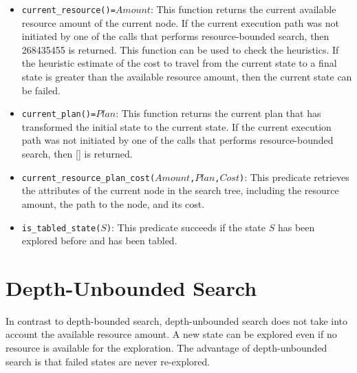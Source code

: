 \begin{itemize}
\item \texttt{current\_resource()=$Amount$}: This function returns the current available resource amount of the current node. If the current execution path was not initiated by one of the calls that performs resource-bounded search, then 268435455 is returned. This function can be used to check the heuristics. If the heuristic estimate of the cost to travel from the current state to a final state is greater than the available resource amount, then the current state can be failed.

\item \texttt{current\_plan()=$Plan$}: This function returns the current plan that has transformed the initial state to the current state. If the current execution path was not initiated by one of the calls that performs resource-bounded search, then [] is returned.

\item \texttt{current\_resource\_plan\_cost($Amount$,$Plan$,$Cost$)}: This predicate retrieves the attributes of the current node in the search tree, including the resource amount, the path to the node, and its cost.

\item \texttt{is\_tabled\_state($S$)}: This predicate succeeds if the state $S$ has been explored before and has been tabled.
\end{itemize}

\section{Depth-Unbounded Search}
In contrast to depth-bounded search, depth-unbounded search does not take into account the available resource amount. A new state can be explored even if no resource is available for the exploration. The advantage of depth-unbounded search is that failed states are never re-explored.

